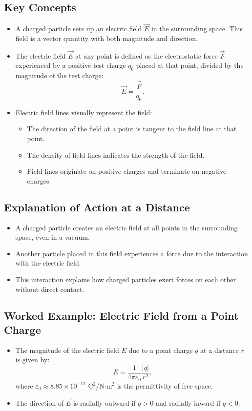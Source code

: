 \documentclass{article}
\begin{document}
\subsection*{Key Concepts}
\begin{itemize}
    \item A charged particle sets up an electric field $\vec{E}$ in the surrounding space. This field is a vector quantity with both magnitude and direction.
    \item The electric field $\vec{E}$ at any point is defined as the electrostatic force $\vec{F}$ experienced by a positive test charge $q_0$ placed at that point, divided by the magnitude of the test charge:
    \[
    \vec{E} = \frac{\vec{F}}{q_0}.
    \]
    \item Electric field lines visually represent the field:
    \begin{itemize}
        \item The direction of the field at a point is tangent to the field line at that point.
        \item The density of field lines indicates the strength of the field.
        \item Field lines originate on positive charges and terminate on negative charges.
    \end{itemize}
\end{itemize}

\subsection*{Explanation of Action at a Distance}
\begin{itemize}
    \item A charged particle creates an electric field at all points in the surrounding space, even in a vacuum.
    \item Another particle placed in this field experiences a force due to the interaction with the electric field.
    \item This interaction explains how charged particles exert forces on each other without direct contact.
\end{itemize}

\subsection*{Worked Example: Electric Field from a Point Charge}
\begin{itemize}
    \item The magnitude of the electric field $E$ due to a point charge $q$ at a distance $r$ is given by:
    \[
    E = \frac{1}{4\pi\varepsilon_0} \frac{|q|}{r^2},
    \]
    where $\varepsilon_0 \approx 8.85 \times 10^{-12}$ C$^2$/N$\cdot$m$^2$ is the permittivity of free space.
    \item The direction of $\vec{E}$ is radially outward if $q > 0$ and radially inward if $q < 0$.
\end{itemize}
\end{document}
